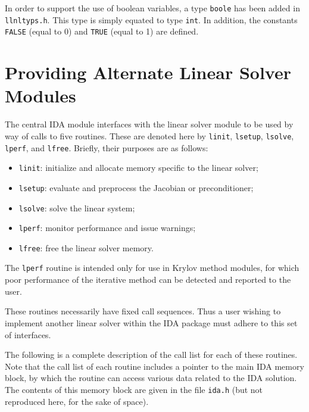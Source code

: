 \documentclass[11pt]{article}
\begin{document}
In order to support the use of boolean variables, a type {\tt boole}
has been added in {\tt llnltyps.h}.  This type is simply equated to
type {\tt int}.  In addition, the constants {\tt FALSE} (equal to 0)
and {\tt TRUE} (equal to 1) are defined.


\section{Providing Alternate Linear Solver Modules}

The central IDA module interfaces with the linear solver module to be
used by way of calls to five routines.  These are denoted here by 
{\tt linit}, {\tt lsetup}, {\tt lsolve}, {\tt lperf}, and {\tt lfree}.
Briefly, their purposes are as follows:
\begin{itemize}
\item {\tt linit}: initialize and allocate memory specific to the
linear solver;
\item {\tt lsetup}: evaluate and preprocess the Jacobian or preconditioner;
\item {\tt lsolve}: solve the linear system;
\item {\tt lperf}: monitor performance and issue warnings;
\item {\tt lfree}: free the linear solver memory.
\end{itemize}
The {\tt lperf} routine is intended only for use in Krylov method
modules, for which poor performance of the iterative method can be 
detected and reported to the user.

These routines necessarily have fixed call sequences.  Thus a user
wishing to implement another linear solver within the IDA package must
adhere to this set of interfaces.

The following is a complete description of the call list for each of
these routines.  Note that the call list of each routine includes a
pointer to the main IDA memory block, by which the routine can access
various data related to the IDA solution.  The contents of this memory
block are given in the file {\tt ida.h} (but not reproduced here, for
the sake of space).
\end{document}
